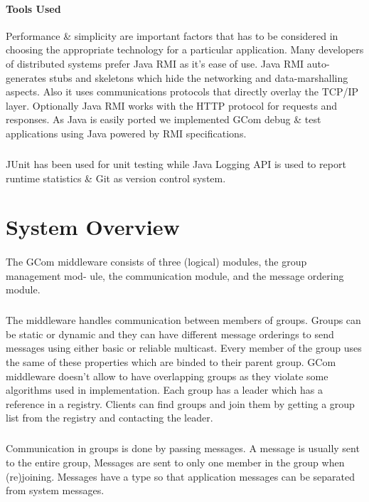 \documentclass[a4paper,english,twoside]{article}
\begin{document}
\paragraph{Tools Used}
Performance \& simplicity are important factors that has to be considered in choosing the appropriate technology for a particular application. Many developers of distributed systems prefer Java RMI as it's ease of use. Java RMI  auto-generates stubs and skeletons which hide the networking and data-marshalling aspects. Also it uses communications protocols that directly overlay the TCP/IP layer. Optionally Java RMI works with the HTTP protocol for requests and responses. As Java is easily ported we implemented GCom debug \& test applications using Java powered by RMI specifications.
 \subparagraph{}
 JUnit has been used for unit testing while Java Logging API is used to report runtime statistics \& Git as version control system.
 
\section{System Overview}
\paragraph{}
The GCom middleware consists of three (logical) modules, the group management mod-
ule, the communication module, and the message ordering module.
\subparagraph{}
The middleware handles communication between members of groups. Groups can be static or dynamic and they can have different message orderings to send messages using either basic or reliable multicast. Every member of the
group uses the same of these properties which are binded to their parent group. GCom middleware doesn't allow to have overlapping groups as they violate some algorithms used in implementation. Each group has a leader which has a reference in a registry. Clients can find groups and join them by getting a group list from the registry and contacting the leader.
\subparagraph{}
Communication in groups is done by passing messages. A message is usually
sent to the entire group, Messages are sent to only one
member in the group when (re)joining. Messages have a type so that application messages can be separated from system messages.
\end{document}

